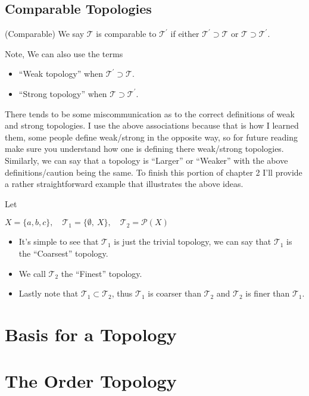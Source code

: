 \documentclass{article}
\newcommand{\topo}{\mathcal T}
\begin{document}
\subsection*{Comparable Topologies}
\begin{myDef*}{(Comparable)}
    We say $\topo$ is comparable to $\topo^{'}$ if either $\topo^{'} \supset \topo$ or $\topo \supset \topo^{'}$. 
\end{myDef*}
\noindent
Note, We can also use the terms
\begin{itemize}
    \item ``Weak topology'' when $\topo^{'} \supset \topo$.
    \item ``Strong topology'' when $\topo \supset \topo^{'}$. 
\end{itemize}
\noindent
There tends to be some miscommunication as to the correct definitions of weak and strong topologies. I use the above
associations because that is how I learned them, some people define weak/strong in the opposite way, so for future reading
make sure you understand how one is defining there weak/strong topologies. Similarly, we can say that a topology is ``Larger''
or ``Weaker'' with the above definitions/caution being the same.
\noindent
To finish this portion of chapter 2 I'll provide a rather straightforward example that illustrates the above ideas.
\begin{myExa*}{}
    Let
    \begin{center}
        $X=\{a,b,c\},\quad \topo_1 =\{\emptyset,\ X\},\quad  \topo_2 =\mathcal{P} (X)$
    \end{center}
    \begin{itemize}
        \item It's simple to see that $\topo_1$ is just the trivial topology, we can say that $\topo_1$ is the ``Coarsest'' topology.
        \item We call $\topo_2$ the ``Finest'' topology.
        \item Lastly note that $\topo_1 \subset \topo_2$, thus $\topo_1$ is coarser than $\topo_2$ and
            $\topo_2$ is finer than $\topo_1$.
    \end{itemize}
    
\end{myExa*}
\newpage
\section{Basis for a Topology}
\newpage

\section{The Order Topology}
\newpage
\end{document}
